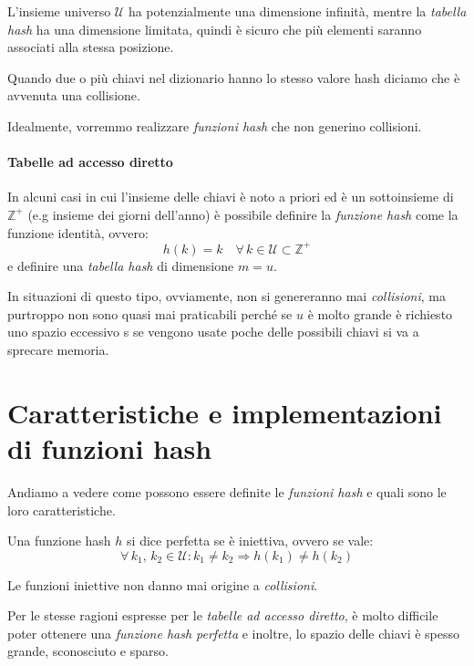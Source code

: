 \begin{note}
    L'insieme universo $\mathcal{U}$ ha potenzialmente una dimensione infinità,
    mentre la \emph{tabella hash} ha una dimensione limitata, quindi è sicuro che
    più elementi saranno associati alla stessa posizione.
\end{note}

\begin{definition}[Collisione]
    Quando due o più chiavi nel dizionario hanno lo stesso valore hash diciamo
    che è avvenuta una collisione.
\end{definition}\noindent
Idealmente, vorremmo realizzare \emph{funzioni hash} che non generino collisioni.

\paragraph{Tabelle ad accesso diretto}
In alcuni casi in cui l'insieme delle chiavi è noto a priori ed è un sottoinsieme
 di $\mathbb{Z}^+$ (e.g insieme dei giorni dell'anno) è possibile
definire la \emph{funzione hash} come la funzione identità, ovvero:
\[h(k)=k\quad\forall\,k\in\mathcal{U}\subset\mathbb{Z}^+\]
e definire una \emph{tabella hash} di dimensione $m=u$.

In situazioni di questo tipo, ovviamente, non si genereranno mai \emph{collisioni},
ma purtroppo non sono quasi mai praticabili perché se $u$ è molto grande è
richiesto uno spazio eccessivo s se vengono usate poche delle possibili
chiavi si va a sprecare memoria.

\section{Caratteristiche e implementazioni di funzioni hash}
Andiamo a vedere come possono essere definite le \emph{funzioni hash} e quali
sono le loro caratteristiche.

\begin{definition}
    Una funzione hash $h$ si dice perfetta se è iniettiva, ovvero se vale:
    \[\forall\,k_1,\,k_2\in\mathcal{U}:k_1\neq k_2\Rightarrow h(k_1)\neq h(k_2)\]
\end{definition}
\begin{note}
    Le funzioni iniettive non danno mai origine a \emph{collisioni}.
\end{note}\noindent
Per le stesse ragioni espresse per le \emph{tabelle ad accesso diretto}, è molto
difficile poter ottenere una \emph{funzione hash perfetta} e inoltre, lo spazio
delle chiavi è spesso grande, sconosciuto e sparso.

